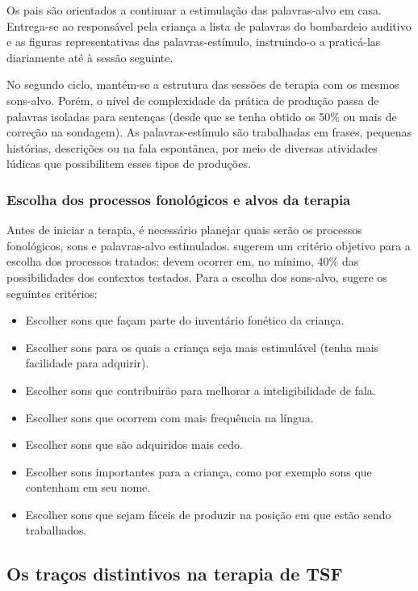 \documentclass[output=paper,colorlinks,citecolor=brown,booklanguage=portuguese]{langscibook}
\begin{document}
Os pais são orientados a continuar a estimulação das palavras-alvo em casa. Entrega-se ao responsável pela criança a lista de palavras do bombardeio auditivo e as figuras representativas das palavras-estímulo, instruindo-o a praticá-las diariamente até à sessão seguinte.

No segundo ciclo, mantém-se a estrutura das sessões de terapia com os mesmos sons-alvo. Porém, o nível de complexidade da prática de produção passa de palavras isoladas para sentenças (desde que se tenha obtido os 50\% ou mais de correção na sondagem). As palavras-estímulo são trabalhadas em frases, pequenas histórias, descrições ou na fala espontânea, por meio de diversas atividades lúdicas que possibilitem esses tipos de produções.

\subsubsection{Escolha dos processos fonológicos e alvos da terapia}\label{sec:cap5sec2umdois}

Antes de iniciar a terapia, é necessário planejar quais serão os processos fonológicos, sons e palavras-alvo estimulados. \citet{Hodson1983} sugerem um critério objetivo para a escolha dos processos tratados: devem ocorrer em, no mínimo, 40\% das possibilidades dos contextos testados. Para a escolha dos sons-alvo, \citet{Edwards1992} sugere os seguintes critérios:

\begin{itemize}
    \item Escolher sons que façam parte do inventário fonético da criança.
\item	Escolher sons para os quais a criança seja mais estimulável (tenha mais facilidade para adquirir).
\item	Escolher sons que contribuirão para melhorar a inteligibilidade de fala.
\item	Escolher sons que ocorrem com mais frequência na língua.
\item	Escolher sons que são adquiridos mais cedo.
\item	Escolher sons importantes para a criança, como por exemplo sons que contenham em seu nome.
\item	Escolher sons que sejam fáceis de produzir na posição em que estão sendo trabalhados.
\end{itemize}
\subsection{Os traços distintivos na terapia de TSF}\label{sec:cap5sec2dois}
\end{document}
